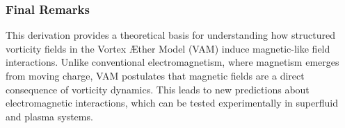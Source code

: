 \subsubsection*{Final Remarks}
This derivation provides a theoretical basis for understanding how structured vorticity fields in the Vortex Æther Model (VAM) induce magnetic-like field interactions. Unlike conventional electromagnetism, where magnetism emerges from moving charge, VAM postulates that magnetic fields are a direct consequence of vorticity dynamics. This leads to new predictions about electromagnetic interactions, which can be tested experimentally in superfluid and plasma systems.
